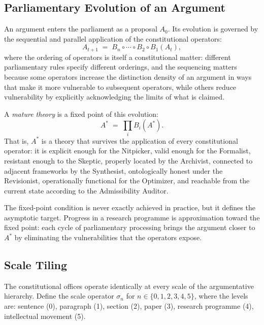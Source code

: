 \documentclass[12pt, letterpaper]{article}
\theoremstyle{remark}
\begin{document}
\subsection{Parliamentary Evolution of an Argument}

An argument enters the parliament as a proposal $A_0$.  Its evolution is
governed by the sequential and parallel application of the constitutional
operators:
\begin{equation}
  A_{t+1} \;=\; B_n \circ \cdots \circ B_2 \circ B_1(A_t),
\end{equation}
where the ordering of operators is itself a constitutional matter: different
parliamentary rules specify different orderings, and the sequencing matters
because some operators increase the distinction density of an argument in ways
that make it more vulnerable to subsequent operators, while others reduce
vulnerability by explicitly acknowledging the limits of what is claimed.

A \emph{mature theory} is a fixed point of this evolution:
\begin{equation}
  A^* \;=\; \prod_i B_i(A^*).
\end{equation}
That is, $A^*$ is a theory that survives the application of every
constitutional operator: it is explicit enough for the Nitpicker, valid enough
for the Formalist, resistant enough to the Skeptic, properly located by the
Archivist, connected to adjacent frameworks by the Synthesist, ontologically
honest under the Revisionist, operationally functional for the Optimizer, and
reachable from the current state according to the Admissibility Auditor.

The fixed-point condition is never exactly achieved in practice, but it
defines the asymptotic target.  Progress in a research programme is
approximation toward the fixed point: each cycle of parliamentary processing
brings the argument closer to $A^*$ by eliminating the vulnerabilities that
the operators expose.

\subsection{Scale Tiling}

The constitutional offices operate identically at every scale of the
argumentative hierarchy.  Define the scale operator $\sigma_n$ for
$n \in \{0, 1, 2, 3, 4, 5\}$, where the levels are: sentence (0), paragraph
(1), section (2), paper (3), research programme (4), intellectual movement (5).
\end{document}
